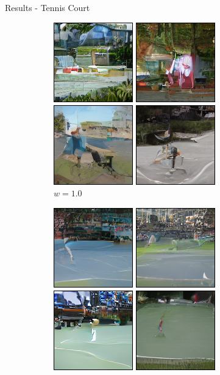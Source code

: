 \documentclass[11pt]{beamer}
\begin{document}
\begin{frame}{Results - Tennis Court}
    \begin{figure}
      \centering
      \begin{subfigure}[b]{0.24\textwidth}
        \includegraphics[width=\linewidth]{figures/A_tennis_court_1.png}
        \caption{$w=1.0$}
      \end{subfigure}
      \begin{subfigure}[b]{0.24\textwidth}
        \includegraphics[width=\linewidth]{figures/A_tennis_court_3.png}

\end{subfigure}
\end{figure}
\end{frame}
\end{document}
